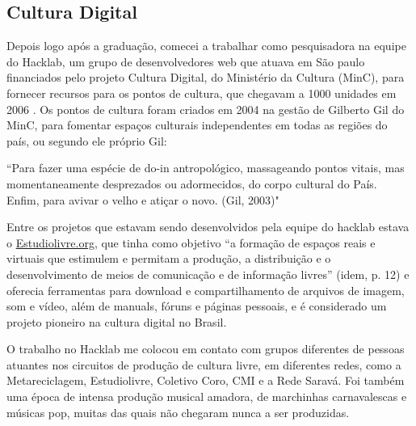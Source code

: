 \subsection{Cultura Digital}

Depois logo após a graduação, comecei a trabalhar como pesquisadora na equipe do Hacklab, um grupo de desenvolvedores web que atuava em São paulo financiados pelo projeto Cultura Digital, do Ministério da Cultura (MinC), para fornecer recursos para os pontos de cultura, que chegavam a 1000 unidades em 2006 \cite[6]{Lima2009}. Os pontos de cultura foram criados em 2004 na gestão de Gilberto Gil do MinC, para fomentar espaços culturais independentes em todas as regiões do país, ou segundo ele próprio Gil:
\begin{citacao}

``Para fazer uma espécie de do-in antropológico, massageando pontos vitais, mas momentaneamente desprezados ou adormecidos, do corpo cultural do País. Enfim, para avivar o velho e atiçar o novo. (Gil, 2003)" 
\end{citacao}


Entre os projetos que estavam sendo desenvolvidos pela equipe do hacklab estava o \url{Estudiolivre.org}, que tinha como objetivo ``a formação de espaços reais e virtuais que estimulem e permitam a produção, a distribuição e o desenvolvimento de meios de comunicação e de informação livres'' (idem, p. 12) e oferecia ferramentas para download e compartilhamento de arquivos de imagem, som e vídeo, além de manuals, fóruns e páginas pessoais, e é considerado um projeto pioneiro na cultura digital no Brasil. 

O trabalho no Hacklab me colocou em contato com grupos diferentes de pessoas atuantes nos circuitos de produção de cultura livre, em diferentes redes, como a Metareciclagem, Estudiolivre, Coletivo Coro, CMI e a Rede Saravá. Foi também uma época de intensa produção musical amadora, de marchinhas carnavalescas e músicas pop, muitas das quais não chegaram nunca a ser produzidas. 


